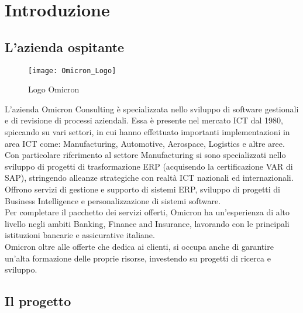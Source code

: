 \chapter{Introduzione}
\label{cap:introduzione}

\section{L'azienda ospitante}

\begin{figure}[!h] 
    \centering 
    \texttt{[image: Omicron\_Logo]} 
    \caption{Logo Omicron}
\end{figure}

\noindent L’azienda Omicron Consulting è specializzata nello sviluppo di software gestionali e di revisione di processi aziendali. Essa è presente nel mercato ICT dal 1980, spiccando su vari settori, in cui hanno effettuato importanti implementazioni in area ICT come:  Manufacturing, Automotive, Aerospace, Logistics e altre aree.
Con particolare riferimento al settore Manufacturing si sono specializzati nello sviluppo di progetti di trasformazione ERP (acquisendo la certificazione VAR di SAP), stringendo alleanze strategiche con realtà ICT nazionali ed internazionali.\\
Offrono servizi di gestione e supporto di sistemi ERP, sviluppo di progetti di Business Intelligence e personalizzazione di sistemi software.\\
Per completare il pacchetto dei servizi offerti, Omicron ha un'esperienza di alto livello negli ambiti Banking, Finance and Insurance, lavorando con le principali istituzioni bancarie e assicurative italiane.\\
Omicron oltre alle offerte che dedica ai clienti, si occupa anche di garantire un'alta formazione delle proprie risorse, investendo su progetti di ricerca e sviluppo.

\section{Il progetto}
